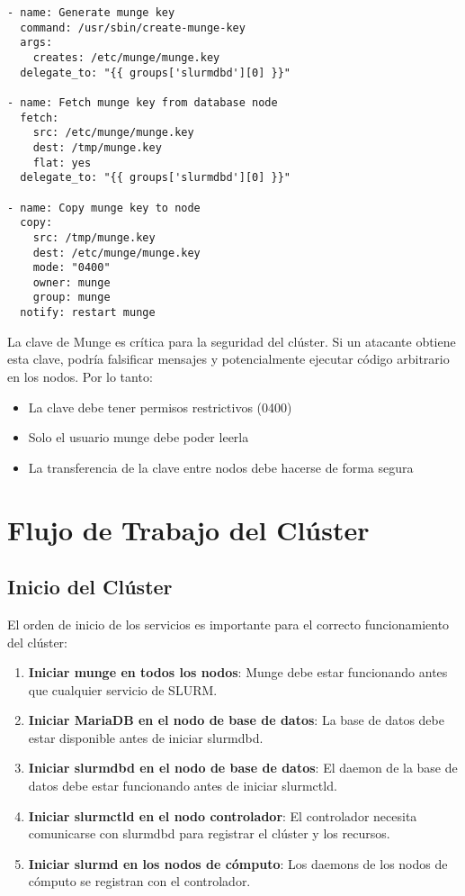 \documentclass[12pt,a4paper]{article}
\begin{document}
\begin{lstlisting}[language=ansible, caption=Configuración de Munge en el clúster]
- name: Generate munge key
  command: /usr/sbin/create-munge-key
  args:
    creates: /etc/munge/munge.key
  delegate_to: "{{ groups['slurmdbd'][0] }}"

- name: Fetch munge key from database node
  fetch:
    src: /etc/munge/munge.key
    dest: /tmp/munge.key
    flat: yes
  delegate_to: "{{ groups['slurmdbd'][0] }}"

- name: Copy munge key to node
  copy:
    src: /tmp/munge.key
    dest: /etc/munge/munge.key
    mode: "0400"
    owner: munge
    group: munge
  notify: restart munge
\end{lstlisting}

\begin{warningbox}
La clave de Munge es crítica para la seguridad del clúster. Si un atacante obtiene esta clave, podría falsificar mensajes y potencialmente ejecutar código arbitrario en los nodos. Por lo tanto:
\begin{itemize}
    \item La clave debe tener permisos restrictivos (0400)
    \item Solo el usuario munge debe poder leerla
    \item La transferencia de la clave entre nodos debe hacerse de forma segura
\end{itemize}
\end{warningbox}

\section{Flujo de Trabajo del Clúster}

\subsection{Inicio del Clúster}

El orden de inicio de los servicios es importante para el correcto funcionamiento del clúster:

\begin{enumerate}[leftmargin=*]
    \item \textbf{Iniciar munge en todos los nodos}: Munge debe estar funcionando antes que cualquier servicio de SLURM.
    \item \textbf{Iniciar MariaDB en el nodo de base de datos}: La base de datos debe estar disponible antes de iniciar slurmdbd.
    \item \textbf{Iniciar slurmdbd en el nodo de base de datos}: El daemon de la base de datos debe estar funcionando antes de iniciar slurmctld.
    \item \textbf{Iniciar slurmctld en el nodo controlador}: El controlador necesita comunicarse con slurmdbd para registrar el clúster y los recursos.
    \item \textbf{Iniciar slurmd en los nodos de cómputo}: Los daemons de los nodos de cómputo se registran con el controlador.
\end{enumerate}
\end{document}
